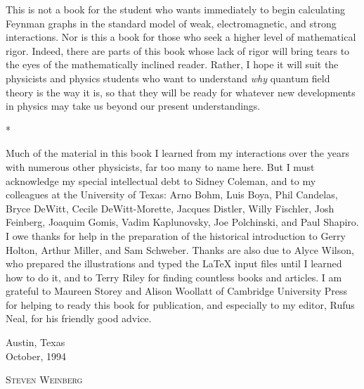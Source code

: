 This is not a book for the student who wants immediately to begin calculating
Feynman graphs in the standard model of weak, electromagnetic, and strong
interactions. Nor is this a book for those who seek a higher level of
mathematical rigor. Indeed, there are parts of this book whose lack of rigor
will bring tears to the eyes of the mathematically inclined reader. Rather, I
hope it will suit the physicists and physics students who want to understand
\emph{why} quantum field theory is the way it is, so that they will be ready for
whatever new developments in physics may take us beyond our present
understandings.

\begin{center}
  *\quad*\quad*
\end{center}

Much of the material in this book I learned from my interactions over the years
with numerous other physicists, far too many to name here. But I must
acknowledge my special intellectual debt to Sidney Coleman, and to my colleagues
at the University of Texas: Arno Bohm, Luis Boya, Phil Candelas, Bryce DeWitt,
Cecile DeWitt-Morette, Jacques Distler, Willy Fischler, Josh Feinberg, Joaquim
Gomis, Vadim Kaplunovsky, Joe Polchinski, and Paul Shapiro. I owe thanks for
help in the preparation of the historical introduction to Gerry Holton, Arthur
Miller, and Sam Schweber. Thanks are also due to Alyce Wilson, who prepared the
illustrations and typed the \LaTeX{} input files until I learned how to do it,
and to Terry Riley for finding countless books and articles. I am grateful to
Maureen Storey and Alison Woollatt of Cambridge University Press for helping to
ready this book for publication, and especially to my editor, Rufus Neal, for
his friendly good advice.

\vspace{2.5em}
\noindent
\begin{minipage}[t]{0.45\textwidth}
Austin, Texas\\
October, 1994
\end{minipage}
\hfill
\begin{minipage}[t]{0.45\textwidth}
\raggedleft
\textsc{Steven Weinberg}
\end{minipage}

